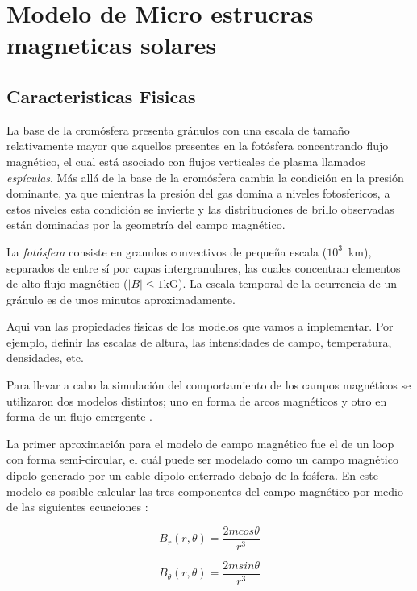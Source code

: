 \documentclass[9pt]{book}
\begin{document}
  
\chapter{Modelo de Micro estrucras magneticas solares}
\section{Caracteristicas Fisicas}

La base de la crom\'osfera presenta gr\'anulos con una escala de tama\~no relativamente mayor que aquellos presentes en la fot\'osfera concentrando flujo magn\'etico, el cual est\'a asociado con flujos verticales de plasma llamados \emph{esp\'iculas}. M\'as all\'a de la base de la crom\'osfera cambia la condici\'on en la presi\'on dominante, ya que mientras la presi\'on del gas domina a niveles fotosfericos, a estos niveles esta condici\'on se invierte y las distribuciones de brillo observadas est\'an dominadas por la geometr\'ia del campo magn\'etico.

La \emph{fot\'osfera}  consiste en granulos convectivos de peque\~na escala ($10^3$~km), separados de entre s\'i por capas intergranulares, las cuales concentran elementos de alto flujo magn\'etico ($|B| \le 1\mbox{kG}$). La escala temporal de la ocurrencia de un gr\'anulo es de unos minutos aproximadamente.



Aqui van las propiedades fisicas de los modelos que vamos a implementar. Por ejemplo, definir las escalas de altura, las intensidades de campo, temperatura, densidades, etc.

Para llevar a cabo la simulaci\'on del comportamiento de los campos magn\'eticos se utilizaron dos modelos distintos; uno en forma de arcos magn\'eticos \cite{loops} y otro en forma de un flujo emergente \cite{flujoemergente}.

La primer aproximaci\'on para el modelo de campo magn\'etico fue el de un loop con forma semi-circular, el cu\'al puede ser modelado como un campo magn\'etico dipolo generado por un cable dipolo enterrado debajo de la fo\'sfera.
En este modelo es posible calcular las tres componentes del campo magn\'etico por medio de las siguientes ecuaciones :

\begin{equation}
    B_r(r,\theta)=\frac{2mcos\theta}{r^3}
\end{equation}
  
\begin{equation}
    B_\theta(r,\theta)=\frac{2msin\theta}{r^3}
\end{equation}
\end{document}
